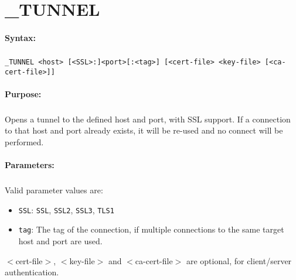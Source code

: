 
\newpage
\section{\_TUNNEL}
\label{cmd:_TUNNEL}

\paragraph{Syntax:}
\subparagraph{}
\texttt{\_TUNNEL <host> [<SSL>:]<port>[:<tag>] [<cert-file> <key-file> [<ca-cert-file>]]}

\paragraph{Purpose:}
\subparagraph{}
Opens a tunnel to the defined host and port, with SSL support. If 
a connection to that host and port already exists, it will be re-used 
and no connect will be performed.

\paragraph{Parameters:}
\subparagraph{}
Valid parameter values are:

\begin{itemize}
\item \texttt{SSL}: \texttt{SSL}, \texttt{SSL2}, \texttt{SSL3}, \texttt{TLS1}
\item \texttt{tag}: The tag of the connection, if multiple connections to the same
                    target host and port are used.
\end{itemize}

$<$cert-file$>$, $<$key-file$>$ and $<$ca-cert-file$>$ are optional, 
for client/server authentication.